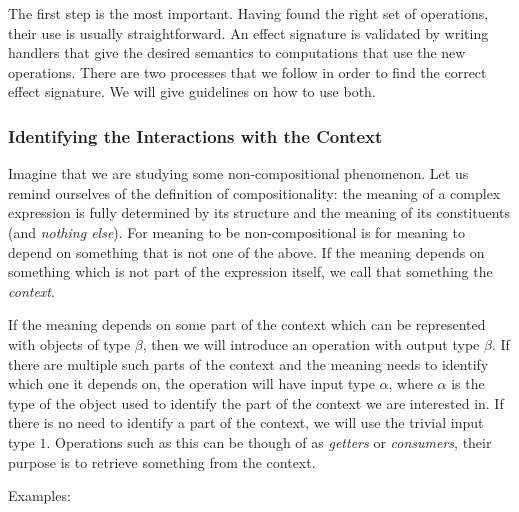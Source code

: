 The first step is the most important. Having found the right set of
operations, their use is usually straightforward. An effect signature is
validated by writing handlers that give the desired semantics to
computations that use the new operations. There are two processes that we
follow in order to find the correct effect signature. We will give
guidelines on how to use both.


\subsubsection{Identifying the Interactions with the Context}

Imagine that we are studying some non-compositional phenomenon. Let us
remind ourselves of the definition of compositionality: the meaning of a
complex expression is fully determined by its structure and the meaning of
its constituents (and \emph{nothing else}). For meaning to be
non-compositional is for meaning to depend on something that is not one of
the above. If the meaning depends on something which is not part of the
expression itself, we call that something the \emph{context}.

If the meaning depends on some part of the context which can be represented
with objects of type $\beta$, then we will introduce an operation with
output type $\beta$. If there are multiple such parts of the context and
the meaning needs to identify which one it depends on, the operation will
have input type $\alpha$, where $\alpha$ is the type of the object used to
identify the part of the context we are interested in. If there is no need
to identify a part of the context, we will use the trivial input type
$1$. Operations such as this can be though of as \emph{getters} or
\emph{consumers}, their purpose is to retrieve something from the context.

Examples:

